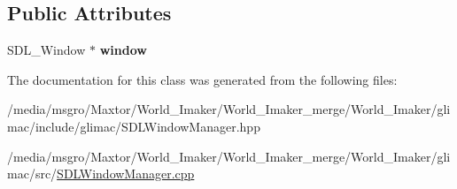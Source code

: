 \subsection*{Public Attributes}
\begin{DoxyCompactItemize}
\item 
\mbox{\label{classglimac_1_1SDLWindowManager_a5999492fdc73a660c624015485a8a71e}} 
S\+D\+L\+\_\+\+Window $\ast$ {\bfseries window}
\end{DoxyCompactItemize}


The documentation for this class was generated from the following files\+:\begin{DoxyCompactItemize}
\item 
/media/msgro/\+Maxtor/\+World\+\_\+\+Imaker/\+World\+\_\+\+Imaker\+\_\+merge/\+World\+\_\+\+Imaker/glimac/include/glimac/S\+D\+L\+Window\+Manager.\+hpp\item 
/media/msgro/\+Maxtor/\+World\+\_\+\+Imaker/\+World\+\_\+\+Imaker\+\_\+merge/\+World\+\_\+\+Imaker/glimac/src/\hyperlink{SDLWindowManager_8cpp}{S\+D\+L\+Window\+Manager.\+cpp}\end{DoxyCompactItemize}
